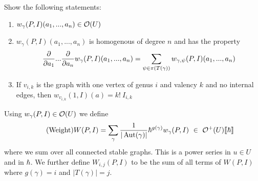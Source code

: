 \begin{ex}
Show the following statements:
\begin{enumerate}
  \item $w_\gamma(P,I)(a_1, ..., a_n) \in \mathcal{O}(U)$

  \item $w_\gamma(P,I)(a_1, ..., a_n)$ is homogenous of degree $n$ and has the property
  \begin{equation}\frac{\partial }{\partial a_1} ... \frac{\partial }{\partial a_n} w_\gamma(P,I)(a_1, ..., a_n) = \sum_{\psi \in \pi(T(\gamma))} w_{\gamma, \psi} (P,I) (a_1, ..., a_n)\end{equation}

  \item If $v_{i,k}$ is the graph with one vertex of genus $i$ and valency $k$ and no internal edges, then $w_{v_{i,k}}(1, I)(a) = k! \ I_{i,k}$
\end{enumerate}
\end{ex}

Using $w_\gamma (P,I) \in \mathcal{O}(U)$ we define
\begin{equation}\label{eq:WPI}\tag{Weight}
  W(P,I) = \sum_\gamma \frac{1}{|\operatorname{Aut}(\gamma)|} \hbar^{g(\gamma)} w_\gamma (P,I) \ \in \ \mathcal{O}^+(U)\llbracket\hbar\rrbracket
\end{equation}
where we sum over all connected stable graphs. This is a power series in $u \in U$ and in $\hbar$. We further define $W_{i,j}(P,I)$ to be the sum of all terms of $W(P,I)$ where $g(\gamma) = i$ and $|T(\gamma)| = j$.

